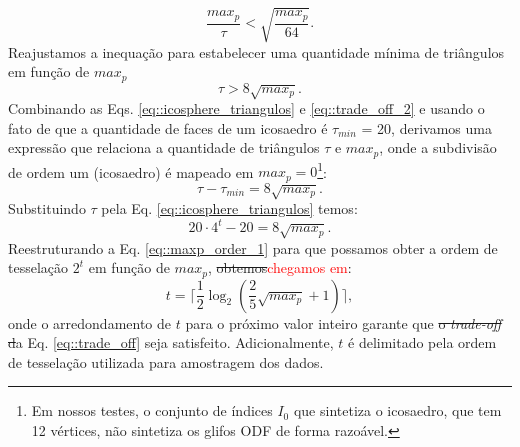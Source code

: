 \begin{equation}
\label{eq::trade_off}
    \frac{max_p}{\tau} < \sqrt{\frac{max_p}{64}}.
\end{equation}
Reajustamos a inequação para estabelecer uma quantidade mínima de triângulos em função de $max_p$
\begin{equation}
\label{eq::trade_off_2}
    \tau > 8\sqrt{max_p}
    .
\end{equation}
Combinando as Eqs. \ref{eq::icosphere_triangulos} e \ref{eq::trade_off_2} e usando o fato de que a quantidade de faces de um icosaedro é $\tau_{min}$ = 20, derivamos uma expressão que relaciona a quantidade de triângulos $\tau$ e $max_p$, onde a subdivisão de ordem um (icosaedro) é mapeado em $max_p = 0$\footnote{Em nossos testes, o conjunto de índices $I_0$ que sintetiza o icosaedro, que tem 12 vértices, não sintetiza os glifos ODF de forma razoável.}:
\begin{equation}
\label{eq::maxp_triangulo}
    \tau - \tau_{min} = 8\sqrt{max_p}.
\end{equation}
Substituindo $\tau$ pela Eq. \ref{eq::icosphere_triangulos} temos:
\begin{equation}
\label{eq::maxp_order_1}
    20 \cdot 4^t - 20 = 8\sqrt{max_p}    .
\end{equation}
Reestruturando a Eq. \ref{eq::maxp_order_1} para que possamos obter a ordem de tesselação $2^t$ em função de $max_p$, \sout{obtemos}\textcolor{red}{chegamos em}:
\begin{equation}
\label{eq::icosa_order}
     t = \lceil \frac{1}{2}\log_2{(\frac{2}{5}\sqrt{max_p} + 1)} \rceil,
\end{equation}
onde o arredondamento de $t$ para o próximo valor inteiro garante que \sout{o \textit{trade-off} d}a Eq. \ref{eq::trade_off} seja satisfeito. Adicionalmente, $t$ é delimitado pela ordem de tesselação utilizada para amostragem dos dados.

